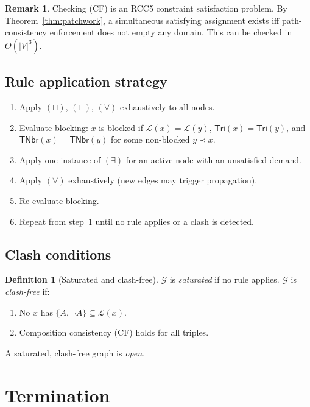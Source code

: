 \documentclass[a4paper,11pt]{article}
\theoremstyle{definition}
\newtheorem{definition}[theorem]{Definition}
\newtheorem{remark}[theorem]{Remark}
\newcommand{\Tri}{\ensuremath{\mathsf{Tri}}}
\newcommand{\TNbr}{\ensuremath{\mathsf{TNbr}}}
\newcommand{\GG}{\ensuremath{\mathcal{G}}}
\newcommand{\LL}{\ensuremath{\mathcal{L}}}
\begin{document}
\begin{remark}
Checking (CF) is an RCC5 constraint satisfaction problem.  By
Theorem~\ref{thm:patchwork}, a simultaneous satisfying
assignment exists iff path-consistency enforcement does not
empty any domain.  This can be checked in $O(|V|^3)$.
\end{remark}

\subsection{Rule application strategy}\label{sec:strategy}

\begin{enumerate}[nosep]
  \item Apply $(\sqcap)$, $(\sqcup)$, $(\forall)$ exhaustively
    to all nodes.
  \item Evaluate blocking: $x$ is blocked if $\LL(x) = \LL(y)$,
    $\Tri(x) = \Tri(y)$, and $\TNbr(x) = \TNbr(y)$ for some
    non-blocked $y \prec x$.
  \item Apply one instance of $(\exists)$ for an active node
    with an unsatisfied demand.
  \item Apply $(\forall)$ exhaustively (new edges may trigger
    propagation).
  \item Re-evaluate blocking.
  \item Repeat from step~1 until no rule applies or a clash
    is detected.
\end{enumerate}

\subsection{Clash conditions}

\begin{definition}[Saturated and clash-free]\label{def:open}
$\GG$ is \emph{saturated} if no rule applies. $\GG$ is
\emph{clash-free} if:
\begin{enumerate}[nosep,label=(C\arabic*)]
  \item No $x$ has $\{A, \neg A\} \subseteq \LL(x)$.
  \item Composition consistency (CF) holds for all triples.
\end{enumerate}
A saturated, clash-free graph is \emph{open}.
\end{definition}


\section{Termination}\label{sec:termination}
\end{document}
